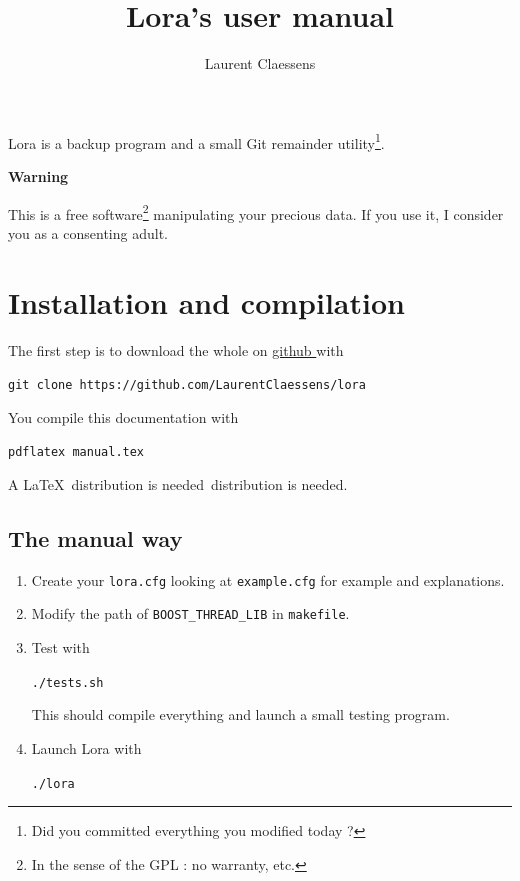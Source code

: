 \documentclass[a4paper,12pt]{article}
\newcommand{\info}[1]{\texttt{#1}}
\begin{document}
\title{Lora's user manual}
\author{Laurent Claessens}
\maketitle

Lora is a backup program and a small Git remainder utility\footnote{Did you committed everything you modified today ?}.

\begin{center}
    {\bf Warning}
\end{center}
This is a free software\footnote{In the sense of the GPL : no warranty, etc.} manipulating your precious data. If you use it, I consider you as a consenting adult.

\tableofcontents

\section{Installation and compilation}

The first step is to download the whole on \href{ https://github.com/LaurentClaessens/lora  }{ github } with
\begin{center}
    \info{git clone https://github.com/LaurentClaessens/lora}
\end{center}

You compile this documentation with
\begin{center}
    \info{pdflatex manual.tex}
\end{center}
A \LaTeX\ distribution is needed\ distribution is needed.

\subsection{The manual way}

\begin{enumerate}
    \item
        Create your \info{lora.cfg} looking at \info{example.cfg} for example and explanations.
    \item
        Modify the path of \info{BOOST\_THREAD\_LIB} in \info{makefile}.
    \item
        Test with
        \begin{center}
            \info{./tests.sh}
        \end{center}
        This should compile everything and launch a small testing program.
    \item
        Launch Lora with
        \begin{center}
            \info{./lora}
        \end{center}
\end{enumerate}
\end{document}
